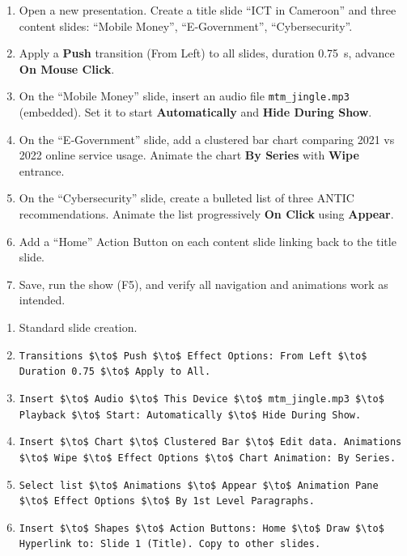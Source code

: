 \documentclass[11pt]{article}
\begin{document}
\begin{exercice}
\begin{enumerate}
\item Open a new presentation. Create a title slide “ICT in Cameroon” and three content slides: “Mobile Money”, “E‑Government”, “Cybersecurity”.
\item Apply a \textbf{Push} transition (From Left) to all slides, duration \SI{0.75}{s}, advance \textbf{On Mouse Click}.
\item On the “Mobile Money” slide, insert an audio file \texttt{mtm\_jingle.mp3} (embedded). Set it to start \textbf{Automatically} and \textbf{Hide During Show}.
\item On the “E‑Government” slide, add a clustered bar chart comparing 2021 vs 2022 online service usage. Animate the chart \textbf{By Series} with \textbf{Wipe} entrance.
\item On the “Cybersecurity” slide, create a bulleted list of three ANTIC recommendations. Animate the list progressively \textbf{On Click} using \textbf{Appear}.
\item Add a “Home” Action Button on each content slide linking back to the title slide.
\item Save, run the show (F5), and verify all navigation and animations work as intended.
\end{enumerate}
\end{exercice}

\begin{corrige}[Exercise]
\begin{enumerate}
\item Standard slide creation.
\item \texttt{Transitions \$\textbackslash{}to\$ Push \$\textbackslash{}to\$ Effect Options: From Left \$\textbackslash{}to\$ Duration 0.75 \$\textbackslash{}to\$ Apply to All.}
\item \texttt{Insert \$\textbackslash{}to\$ Audio \$\textbackslash{}to\$ This Device \$\textbackslash{}to\$ mtm\_jingle.mp3 \$\textbackslash{}to\$ Playback \$\textbackslash{}to\$ Start: Automatically \$\textbackslash{}to\$ Hide During Show.}
\item \texttt{Insert \$\textbackslash{}to\$ Chart \$\textbackslash{}to\$ Clustered Bar \$\textbackslash{}to\$ Edit data. Animations \$\textbackslash{}to\$ Wipe \$\textbackslash{}to\$ Effect Options \$\textbackslash{}to\$ Chart Animation: By Series.}
\item \texttt{Select list \$\textbackslash{}to\$ Animations \$\textbackslash{}to\$ Appear \$\textbackslash{}to\$ Animation Pane \$\textbackslash{}to\$ Effect Options \$\textbackslash{}to\$ By 1st Level Paragraphs.}
\item \texttt{Insert \$\textbackslash{}to\$ Shapes \$\textbackslash{}to\$ Action Buttons: Home \$\textbackslash{}to\$ Draw \$\textbackslash{}to\$ Hyperlink to: Slide 1 (Title). Copy to other slides.}
\end{enumerate}
\end{corrige}
\end{document}
